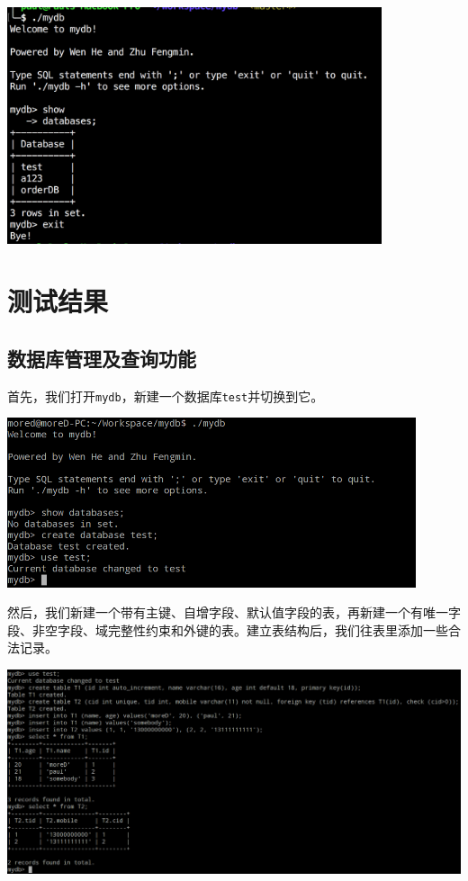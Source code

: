 \documentclass[11pt, a4paper]{article}
\makeatletter
\newcommand\fcaption{\def\@captype{figure}\caption}
\makeatother
\begin{document}
\begin{center}
    \includegraphics[width=11cm]{fig/multi-row}
    \fcaption{交互式终端允许多行输入}\label{inter:multi}
\end{center}

\section{测试结果}

\subsection{数据库管理及查询功能}

首先，我们打开\texttt{mydb}，新建一个数据库\texttt{test}并切换到它。

\begin{center}
    \includegraphics[width=12cm]{fig/create-db}
    \fcaption{新建数据库并切换}
\end{center}

然后，我们新建一个带有主键、自增字段、默认值字段的表，再新建一个有唯一字段、非空字段、域完整性约束和外键的表。建立表结构后，我们往表里添加一些合法记录。

\begin{center}
    \includegraphics[width=15cm]{fig/create-table}
    \fcaption{建表并插入记录}
\end{center}
\end{document}
